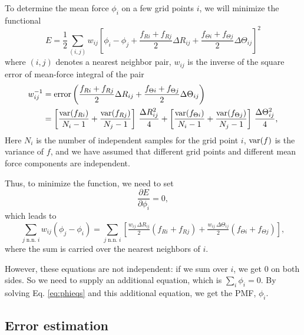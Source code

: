 \documentclass{article}
\begin{document}
To determine the mean force $\phi_i$ on a few grid points $i$,
we will minimize the functional
$$
E
=
\frac 1 2
\sum_{(i, j)}
  w_{ij}
  \left[
  \phi_i - \phi_j
  +
    \frac{ f_{Ri} + f_{Rj} } { 2 } \Delta R_{ij}
       +
    \frac{ f_{\Theta i} + f_{\Theta j} } { 2 } \Delta \Theta_{ij}
  \right]^2
$$
where
$(i, j)$ denotes a nearest neighbor pair,
$w_{ij}$ is the inverse of the square error of mean-force integral
of the pair
\begin{align*}
  w_{ij}^{-1}
&=
  \mathrm{error}
  \left(
    \frac{ f_{Ri} + f_{Rj} } { 2 } \Delta R_{ij}
       +
    \frac{ f_{\Theta i} + f_{\Theta j} } { 2 } \Delta \Theta_{ij}
  \right)
\\
&=
  \left[
    \frac{ \mathrm{var} (f_{Ri}) } { N_i - 1 }
  + \frac{ \mathrm{var} (f_{Rj}) } { N_j - 1}
  \right]
  \, \frac{ \Delta R_{ij}^2 } { 4 }
  +
  \left[
    \frac{ \mathrm{var} (f_{\Theta i}) } { N_i - 1}
  + \frac{ \mathrm{var} (f_{\Theta j}) } { N_j - 1}
  \right]
  \, \frac{ \Delta \Theta_{ij}^2 } { 4 }
,
\end{align*}
Here
$N_i$ is the number of independent samples for the grid point $i$,
$\mathrm{var} (f)$ is the variance of $f$,
and we have assumed that different grid points and
different mean force components are independent.

Thus, to minimize the function, we need to set
$$
\frac{ \partial E } { \partial \phi_i }
=
0,
$$
%
which leads to
\begin{equation}
\sum_{j \mathrm{\; n.n. \; } i }
  w_{ij} ( \phi_j - \phi_i )
=
\sum_{j \mathrm{\; n.n. \; } i }
  \left[
  \tfrac { w_{ij} \, \Delta R_{ij} } 2
  (f_{Ri} + f_{Rj})
  +
  \tfrac { w_{ij} \, \Delta \Theta_{ij} } 2
  (f_{\Theta i} + f_{\Theta j})
  \right]
,
\label{eq:phieqs}
\end{equation}
where the sum is carried over the nearest neighbors of $i$.

However, these equations are not independent:
if we sum over $i$, we get $0$ on both sides.
%
So we need to supply an additional equation,
which is $\sum_i \phi_i = 0$.
%
By solving Eq. \eqref{eq:phieqs} and this additional equation,
we get the PMF, $\phi_i$.

\subsection{Error estimation}
\end{document}
